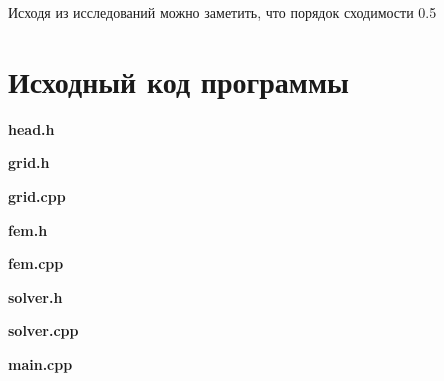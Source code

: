 \documentclass[12pt, a4paper]{article}
\newcommand{\myCodeInput}[3]{
{\bf #2}

}
\begin{document}
Исходя из исследований можно заметить, что порядок сходимости 0.5



\section{Исходный код программы}
\myCodeInput{c++}{head.h}{../head.h}

\myCodeInput{c++}{grid.h}{../grid.h}
\myCodeInput{c++}{grid.cpp}{../grid.cpp}

\myCodeInput{c++}{fem.h}{../fem.h}
\myCodeInput{c++}{fem.cpp}{../fem.cpp}

\myCodeInput{c++}{solver.h}{../solver.h}
\myCodeInput{c++}{solver.cpp}{../solver.cpp}

\myCodeInput{c++}{main.cpp}{../main.cpp}
\end{document}
